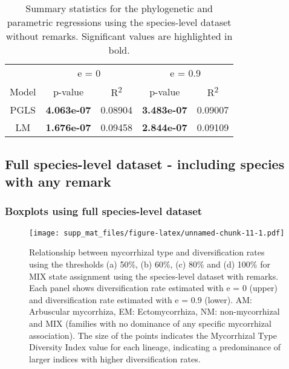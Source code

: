 \documentclass[]{article}
\begin{document}
\begin{table}[H]

\caption{\label{tab:unnamed-chunk-9}Summary statistics for the phylogenetic and parametric regressions using the species-level dataset without remarks. Significant values are highlighted in bold.}
\centering
\begin{tabular}{c|c|c|c|c}
\hline
\multicolumn{1}{c|}{ } & \multicolumn{2}{c|}{e = 0} & \multicolumn{2}{c}{e = 0.9} \\
\cline{2-3} \cline{4-5}
Model & p-value & R\textsuperscript{2} & p-value & R\textsuperscript{2}\\
\hline
PGLS & \textbf{4.063e-07} & 0.08904 & \textbf{3.483e-07} & 0.09007\\
\hline
LM & \textbf{1.676e-07} & 0.09458 & \textbf{2.844e-07} & 0.09109\\
\hline
\end{tabular}
\end{table}

\hypertarget{full-species-level-dataset---including-species-with-any-remark}{%
\subsection{Full species-level dataset - including species with any
remark}\label{full-species-level-dataset---including-species-with-any-remark}}

\hypertarget{boxplots-using-full-species-level-dataset}{%
\subsubsection{Boxplots using full species-level
dataset}\label{boxplots-using-full-species-level-dataset}}

\begin{figure}
\centering
\texttt{[image: supp\_mat\_files/figure-latex/unnamed-chunk-11-1.pdf]}
\caption{Relationship between mycorrhizal type and diversification rates
using the thresholds (a) 50\%, (b) 60\%, (c) 80\% and (d) 100\% for MIX
state assignment using the species-level dataset with remarks. Each
panel shows diversification rate estimated with e = 0 (upper) and
diversification rate estimated with e = 0.9 (lower). AM: Arbuscular
mycorrhiza, EM: Ectomycorrhiza, NM: non-mycorrhizal and MIX (families
with no dominance of any specific mycorrhizal association). The size of
the points indicates the Mycorrhizal Type Diversity Index value for each
lineage, indicating a predominance of larger indices with higher
diversification rates.}
\end{figure}
\end{document}
